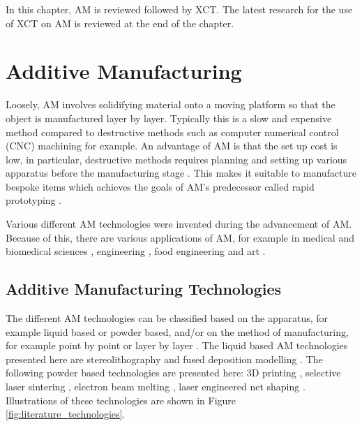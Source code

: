 In this chapter, AM is reviewed followed by XCT. The latest research for the use of XCT on AM is reviewed at the end of the chapter.

\section{Additive Manufacturing}

Loosely, AM involves solidifying material onto a moving platform so that the object is manufactured layer by layer. Typically this is a slow and expensive method compared to destructive methods such as computer numerical control (CNC) machining for example. An advantage of AM is that the set up cost is low, in particular, destructive methods requires planning and setting up various apparatus before the manufacturing stage \citep{gibson2010additive}. This makes it suitable to manufacture bespoke items which achieves the goals of AM's predecessor called rapid prototyping \citep{kruth1991material}.

Various different AM technologies were invented during the advancement of AM. Because of this, there are various applications of AM, for example in medical and biomedical sciences \citep{kang20163d, kourra2018computed}, engineering \citep{cooper2015design}, food engineering \citep{godoi20163d} and art \citep{ornes2013mathematics, grossman2019bathsheba}.

\subsection{Additive Manufacturing Technologies}

The different AM technologies can be classified based on the apparatus, for example liquid based or powder based, and/or on the method of manufacturing, for example point by point or layer by layer \citep{kruth1991material}. The liquid based AM technologies presented here are stereolithography \citep{kodama1981automatic, hull1986apparatus, 3d2019our} and fused deposition modelling \citep{crump1991fused, crump1992apparatus, stratasys2019what}. The following powder based technologies are presented here: 3D printing \citep{sachs1990three}, selective laser sintering \citep{deckard1989method, dtm1990the, 3d2019our}, electron beam melting \citep{larsson2004arrangement, arcam2019history}, laser engineered net shaping \citep{atwood1998laser}. Illustrations of these technologies are shown in Figure \ref{fig:literature_technologies}.

